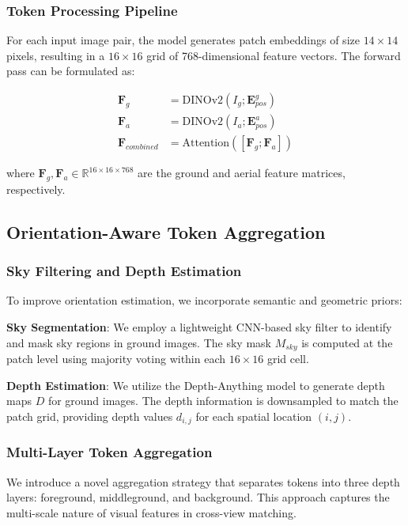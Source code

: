 \subsubsection{Token Processing Pipeline}

For each input image pair, the model generates patch embeddings of size $14 \times 14$ pixels, resulting in a $16 \times 16$ grid of 768-dimensional feature vectors. The forward pass can be formulated as:

\begin{align}
\mathbf{F}_g &= \text{DINOv2}(I_g; \mathbf{E}_{pos}^g) \\
\mathbf{F}_a &= \text{DINOv2}(I_a; \mathbf{E}_{pos}^a) \\
\mathbf{F}_{combined} &= \text{Attention}([\mathbf{F}_g; \mathbf{F}_a])
\end{align}

where $\mathbf{F}_g, \mathbf{F}_a \in \mathbb{R}^{16 \times 16 \times 768}$ are the ground and aerial feature matrices, respectively.

\subsection{Orientation-Aware Token Aggregation}

\subsubsection{Sky Filtering and Depth Estimation}

To improve orientation estimation, we incorporate semantic and geometric priors:

\textbf{Sky Segmentation}: We employ a lightweight CNN-based sky filter to identify and mask sky regions in ground images. The sky mask $M_{sky}$ is computed at the patch level using majority voting within each $16 \times 16$ grid cell.

\textbf{Depth Estimation}: We utilize the Depth-Anything model to generate depth maps $D$ for ground images. The depth information is downsampled to match the patch grid, providing depth values $d_{i,j}$ for each spatial location $(i,j)$.

\subsubsection{Multi-Layer Token Aggregation}

We introduce a novel aggregation strategy that separates tokens into three depth layers: foreground, middleground, and background. This approach captures the multi-scale nature of visual features in cross-view matching.

